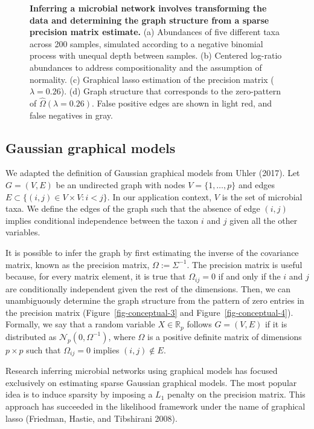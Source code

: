 \documentclass[
  a4paper,
]{article}
\begin{document}
\begin{figure}
\caption{\label{fig-conceptual}\textbf{Inferring a microbial network
involves transforming the data and determining the graph structure from
a sparse precision matrix estimate.} (a) Abundances of five different
taxa across 200 samples, simulated according to a negative binomial
process with unequal depth between samples. (b) Centered log-ratio
abundances to address compositionality and the assumption of normality.
(c) Graphical lasso estimation of the precision matrix
(\(\lambda = 0.26\)). (d) Graph structure that corresponds to the
zero-pattern of \(\hat \Omega(\lambda = 0.26)\). False positive edges
are shown in light red, and false negatives in gray.}

\end{figure}

\hypertarget{gaussian-graphical-models}{%
\subsection{Gaussian graphical models}\label{gaussian-graphical-models}}

We adapted the definition of Gaussian graphical models from Uhler
(2017). Let \(G = (V, E)\) be an undirected graph with nodes
\(V=\{1, \dots, p\}\) and edges
\(E \subset \{(i, j) \in V\times V : i<j\}\). In our application
context, \(V\) is the set of microbial taxa. We define the edges of the
graph such that the absence of edge \((i, j)\) implies conditional
independence between the taxon \(i\) and \(j\) given all the other
variables.

It is possible to infer the graph by first estimating the inverse of the
covariance matrix, known as the precision matrix,
\(\Omega:= \Sigma^{-1}\). The precision matrix is useful because, for
every matrix element, it is true that \(\Omega_{ij}=0\) if and only if
the \(i\) and \(j\) are conditionally independent given the rest of the
dimensions. Then, we can unambiguously determine the graph structure
from the pattern of zero entries in the precision matrix
(Figure~\ref{fig-conceptual-3} and Figure~\ref{fig-conceptual-4}).
Formally, we say that a random variable \(X \in \mathbb R_p\) follows
\(G = (V, E)\) if it is distributed as
\(\mathcal N_p(0, \Omega ^{-1})\), where \(\Omega\) is a positive
definite matrix of dimensions \(p\times p\) such that
\(\Omega_{ij} = 0\) implies \((i, j) \notin E\).

Research inferring microbial networks using graphical models has focused
exclusively on estimating sparse Gaussian graphical models. The most
popular idea is to induce sparsity by imposing a \(L_1\) penalty on the
precision matrix. This approach has succeeded in the likelihood
framework under the name of graphical lasso (Friedman, Hastie, and
Tibshirani 2008).
\end{document}
